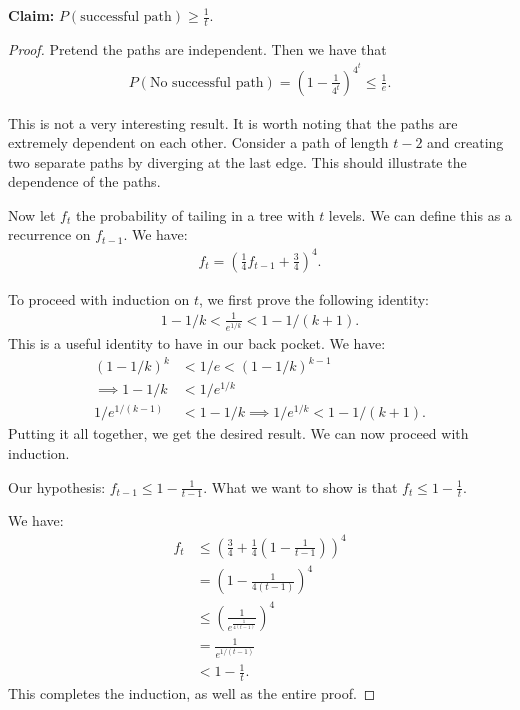 \documentclass{report}
\begin{document}
\noindent \textbf{Claim:} $P(\text{successful path}) \geq \frac{1}{t}$.
\begin{proof}
    Pretend the paths are independent. Then we have that
    \begin{align*}
        P(\text{No successful path}) = \left(1 - \frac{1}{4^t}\right)^{4^t} \leq \frac{1}{e}.
    \end{align*}

    This is not a very interesting result. It is worth noting that the paths are extremely dependent on each other. Consider a path of length $t-2$ and creating two separate paths by diverging at the last edge. This should illustrate the dependence of the paths.

    Now let $f_t$ the probability of tailing in a tree with $t$ levels. We can define this as a recurrence on $f_{t-1}$. We have:
    \begin{align*}
        f_t = \left(\frac{1}{4} f_{t-1} + \frac{3}{4}\right)^4.
    \end{align*}

    To proceed with induction on $t$, we first prove the following identity:
    \begin{align*}
        1 - 1/k < \frac{1}{e^{1/k}} < 1 - 1/(k+1).
    \end{align*}
    This is a useful identity to have in our back pocket. We have:
    \begin{align*}
        (1 - 1/k)^k &< 1/e < (1 - 1/k)^{k-1} \\
        \implies 1 - 1/k &< 1/e^{1/k} \\ 1/e^{1/(k-1)} &< 1 - 1/k \implies 1/e^{1/k} < 1 - 1/(k+1).
    \end{align*}
    Putting it all together, we get the desired result. We can now proceed with induction.

    Our hypothesis: $f_{t-1} \leq 1 - \frac{1}{t-1}$. What we want to show is that $f_t \leq 1 - \frac 1t$. 

    We have:
    \begin{align*}
        f_t &\leq \left( \frac 34 + \frac 14 \left( 1 - \frac{1}{t-1} \right)\right)^4 \\
        &= \left(1 - \frac{1}{4(t-1)}\right)^4 \\
        &\leq \left(\frac{1}{e^{\frac{1}{4(t-1)}}}\right)^4 \\
        &= \frac{1}{e^{1/(t-1)}} \tag{by the above identity}\\
        &< 1 - \frac{1}{t}. \tag{by the above identity}
    \end{align*}
    This completes the induction, as well as the entire proof.
\end{proof}
\end{document}
